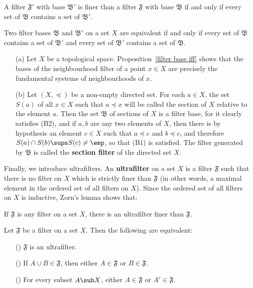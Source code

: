 \begin{corollary}\label{filter finer iff base finer}
A filter $\mathfrak{F}'$ with base $\mathfrak{B}'$ is finer than a filter $\mathfrak{F}$ with base $\mathfrak{B}$ if and only if every set of $\mathfrak{B}$ contains a set of $\mathfrak{B}'$.
\end{corollary}
\begin{corollary}
Two filter bases $\mathfrak{B}$ and $\mathfrak{B}'$ on a set $X$ are equivalent if and only if every set of $\mathfrak{B}$ contains a set of $\mathfrak{B}'$ and every set of $\mathfrak{B}'$ contains a set of $\mathfrak{B}$.
\end{corollary}
\begin{example}
\mbox{}
\begin{itemize}
\item[(a)] Let $X$ be a topological space. Proposition~\ref{filter base iff} shows that the bases of the neighbourhood filter of a point $x\in X$ are precisely the fundamental systems of neighbourhoods of $x$.
\item[(b)] Let $(X,\preceq)$ be a non-empty directed set. For each $a\in X$, the set $S(a)$ of all $x\in X$ such that $a\preceq x$ will be called the section of $X$ relative to the element $a$. Then the set $\mathfrak{B}$ of sections of $X$ is a filter base, for it clearly satisfies (B2), and if $a,b$ are any two elements of $X$, then there is by hypothesis an element $c\in X$ such that $a\preceq c$ and $b\preceq c$, and therefore $S(a)\cap S(b)\sups S(c)\neq\emp$, so that (B1) is satisfied. The filter generated by $\mathfrak{B}$ is called the \textbf{section filter} of the directed set $X$. 
\end{itemize}
\end{example}
Finally, we introduce ultrafilters. An \textbf{ultrafilter} on a set $X$ is a filter $\mathfrak{F}$ such that there is no filter on $X$ which is strictly finer than $\mathfrak{F}$ (in other words, a maximal element in the ordered set of all filters on $X$). Since the ordered set of all filters on $X$ is inductive, Zorn's lemma shows that:
\begin{proposition}
If $\mathfrak{F}$ is any filter on a set $X$, there is an ultrafilter finer than $\mathfrak{F}$.
\end{proposition}
\begin{theorem}\label{ultrafilter char}
Let $\mathfrak{F}$ be a filter on a set $X$. Then the following are equivalent:
\begin{itemize}
\item[(\rmnum{1})] $\mathfrak{F}$ is an ultrafilter.
\item[(\rmnum{2})] If $A\cup B\in\mathfrak{F}$, then either $A\in\mathfrak{F}$ or $B\in\mathfrak{F}$.
\item[(\rmnum{3})] For every subset $A\sub X$, either $A\in\mathfrak{F}$ or $A^c\in\mathfrak{F}$.
\end{itemize}
\end{theorem}
